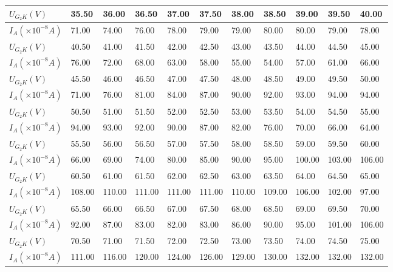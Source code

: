 \documentclass[]{../../templates/Report}%
\begin{document}
\begin{fullreportonly}
\begin{longtable}{C{.10\textwidth}*{10}{C{.06\textwidth}}}
    \midrule
    $U_{G_2K}(\si{V})$ & 35.50 & 36.00 & 36.50 & 37.00 & 37.50 & 38.00 & 38.50 & 39.00 & 39.50 & 40.00 \\
    \midrule
    $I_A(\times 10^{-8}\si{A})$ & 71.00 & 74.00 & 76.00 & 78.00 & 79.00 & 79.00 & 80.00 & 80.00 & 79.00 & 78.00 \\
    \midrule
    $U_{G_2K}(\si{V})$ & 40.50 & 41.00 & 41.50 & 42.00 & 42.50 & 43.00 & 43.50 & 44.00 & 44.50 & 45.00 \\
    \midrule
    $I_A(\times 10^{-8}\si{A})$ & 76.00 & 72.00 & 68.00 & 63.00 & 58.00 & 55.00 & 54.00 & 57.00 & 61.00 & 66.00 \\
    \midrule
    $U_{G_2K}(\si{V})$ & 45.50 & 46.00 & 46.50 & 47.00 & 47.50 & 48.00 & 48.50 & 49.00 & 49.50 & 50.00 \\
    \midrule
    $I_A(\times 10^{-8}\si{A})$ & 71.00 & 76.00 & 81.00 & 84.00 & 87.00 & 90.00 & 92.00 & 93.00 & 94.00 & 94.00 \\
    \midrule
    $U_{G_2K}(\si{V})$ & 50.50 & 51.00 & 51.50 & 52.00 & 52.50 & 53.00 & 53.50 & 54.00 & 54.50 & 55.00 \\
    \midrule
    $I_A(\times 10^{-8}\si{A})$ & 94.00 & 93.00 & 92.00 & 90.00 & 87.00 & 82.00 & 76.00 & 70.00 & 66.00 & 64.00 \\
    \midrule
    $U_{G_2K}(\si{V})$ & 55.50 & 56.00 & 56.50 & 57.00 & 57.50 & 58.00 & 58.50 & 59.00 & 59.50 & 60.00 \\
    \midrule
    $I_A(\times 10^{-8}\si{A})$ & 66.00 & 69.00 & 74.00 & 80.00 & 85.00 & 90.00 & 95.00 & 100.00 & 103.00 & 106.00 \\
    \midrule
    $U_{G_2K}(\si{V})$ & 60.50 & 61.00 & 61.50 & 62.00 & 62.50 & 63.00 & 63.50 & 64.00 & 64.50 & 65.00 \\
    \midrule
    $I_A(\times 10^{-8}\si{A})$ & 108.00 & 110.00 & 111.00 & 111.00 & 111.00 & 110.00 & 109.00 & 106.00 & 102.00 & 97.00 \\
    \midrule
    $U_{G_2K}(\si{V})$ & 65.50 & 66.00 & 66.50 & 67.00 & 67.50 & 68.00 & 68.50 & 69.00 & 69.50 & 70.00 \\
    \midrule
    $I_A(\times 10^{-8}\si{A})$ & 92.00 & 87.00 & 83.00 & 82.00 & 83.00 & 86.00 & 90.00 & 95.00 & 101.00 & 106.00 \\
    \midrule
    $U_{G_2K}(\si{V})$ & 70.50 & 71.00 & 71.50 & 72.00 & 72.50 & 73.00 & 73.50 & 74.00 & 74.50 & 75.00 \\
    \midrule
    $I_A(\times 10^{-8}\si{A})$ & 111.00 & 116.00 & 120.00 & 124.00 & 126.00 & 129.00 & 130.00 & 132.00 & 132.00 & 132.00 \\

\end{longtable}
\end{fullreportonly}
\end{document}
